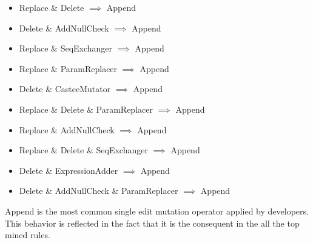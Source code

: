 \documentclass[conference]{IEEEtran}
\begin{document}

\begin{itemize}
\item Replace \& Delete $\implies$ Append
\item Delete \& AddNullCheck $\implies$ Append
\item Replace \& SeqExchanger $\implies$ Append
\item Replace \& ParamReplacer $\implies$ Append
\item Delete \& CasteeMutator $\implies$ Append
\item Replace \& Delete \& ParamReplacer $\implies$ Append
\item Replace \& AddNullCheck $\implies$ Append
\item Replace \& Delete \& SeqExchanger $\implies$ Append
\item Delete \& ExpressionAdder $\implies$ Append
\item Delete \& AddNullCheck \& ParamReplacer $\implies$ Append
\end{itemize}

Append is the most common single edit mutation operator applied by developers. This behavior is
reflected in the fact that it is the consequent in the all the top mined
rules.  
\end{document}

